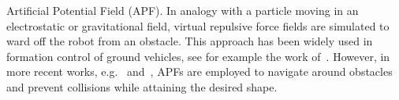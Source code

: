 \documentclass{ifacconf}
\begin{document}
Artificial Potential Field (APF).
In analogy with a particle moving in an electrostatic or gravitational
field, virtual repulsive force fields are simulated to ward off the robot
from an obstacle.
This approach has been widely used in formation control of ground vehicles,
see for example the work of~\cite{Yongshen2018}.
However, in more recent works, e.g.~\cite{HAN2024106105} and~\cite{Piet2025Control},
APFs are employed to navigate around obstacles and prevent collisions 
while attaining the desired shape.
\end{document}
